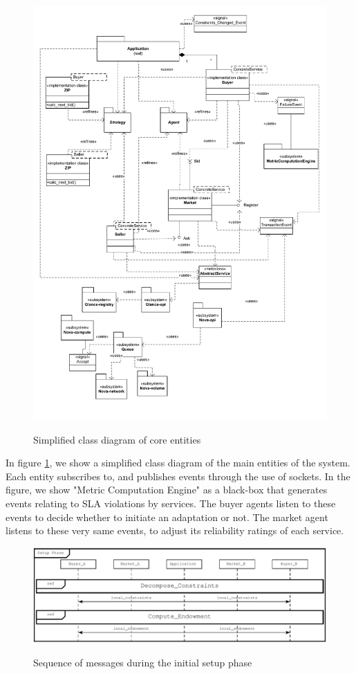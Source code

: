 \documentclass[10pt,journal,compsoc]{IEEEtran}
\begin{document}
\begin{figure}[h]
	\centering
	\includegraphics[totalheight=0.5\textheight, angle=270]{drawings/class_and_package_diagram.pdf}
	\label{class_diagram}
	\caption{Simplified class diagram of core entities}
\end{figure}

In figure \ref{class_diagram}, we show a simplified class diagram of the main entities of the system. Each entity subscribes to, and publishes events through the use of sockets. In the figure, we show "Metric Computation Engine" as a black-box that generates events relating to SLA violations by services. The buyer agents listen to these events to decide whether to initiate an adaptation or not. The market agent listens to these very same events, to adjust its reliability ratings of each service. 

\begin{figure}
	\centering
	\includegraphics[scale=0.3]{drawings/setup_phase.auml.pdf}
	\label{setup_phase}
	\caption{Sequence of messages during the initial setup phase}
\end{figure}
\end{document}
